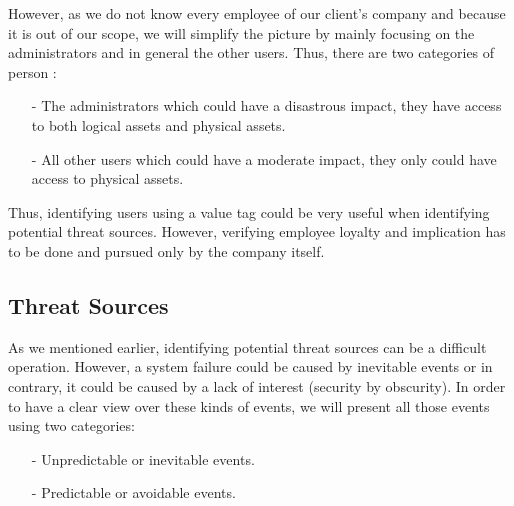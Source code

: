 \documentclass[a4paper,10pt]{article}
\begin{document}
However, as we do not know every employee of our client's company and because it is out of our scope, we will simplify the picture by mainly focusing on the administrators and in general the other users. Thus, there are two categories of person :
\begin{enumerate}
\item[-] The administrators which could have a disastrous impact, they have access to both logical assets and physical assets.
\item[-] All other users which could have a moderate impact, they only could have access to physical assets.
\end{enumerate}
Thus, identifying users using a value tag could be very useful when identifying potential threat sources. However, verifying employee loyalty and implication has to be done and pursued only by the company itself.

\subsection{Threat Sources}

As we mentioned earlier, identifying potential threat sources can be a difficult operation. However, a system failure could be caused by inevitable events or in contrary, it could be caused by a lack of interest (security by obscurity). In order to have a clear view over these kinds of events, we will present all those events using two categories:
\begin{enumerate}
\item[-] Unpredictable or inevitable events.
\item[-] Predictable or avoidable events.
\end{enumerate}
\end{document}
